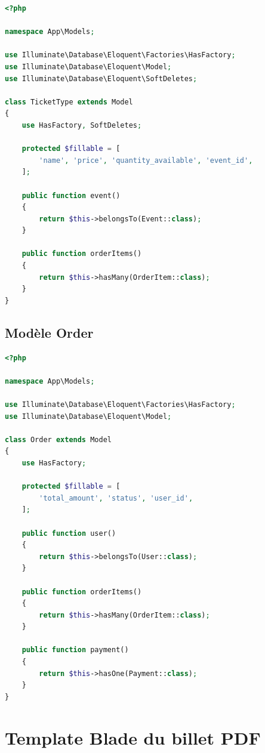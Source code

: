 \documentclass[a4paper,12pt,twoside]{report}
\begin{document}
\begin{lstlisting}[language=PHP,caption=app/Models/TicketType.php]
<?php

namespace App\Models;

use Illuminate\Database\Eloquent\Factories\HasFactory;
use Illuminate\Database\Eloquent\Model;
use Illuminate\Database\Eloquent\SoftDeletes;

class TicketType extends Model
{
    use HasFactory, SoftDeletes;

    protected $fillable = [
        'name', 'price', 'quantity_available', 'event_id',
    ];

    public function event()
    {
        return $this->belongsTo(Event::class);
    }

    public function orderItems()
    {
        return $this->hasMany(OrderItem::class);
    }
}
\end{lstlisting}

\section{Modèle Order}

\begin{lstlisting}[language=PHP,caption=app/Models/Order.php]
<?php

namespace App\Models;

use Illuminate\Database\Eloquent\Factories\HasFactory;
use Illuminate\Database\Eloquent\Model;

class Order extends Model
{
    use HasFactory;

    protected $fillable = [
        'total_amount', 'status', 'user_id',
    ];

    public function user()
    {
        return $this->belongsTo(User::class);
    }

    public function orderItems()
    {
        return $this->hasMany(OrderItem::class);
    }

    public function payment()
    {
        return $this->hasOne(Payment::class);
    }
}
\end{lstlisting}

\chapter{Template Blade du billet PDF}
\end{document}
